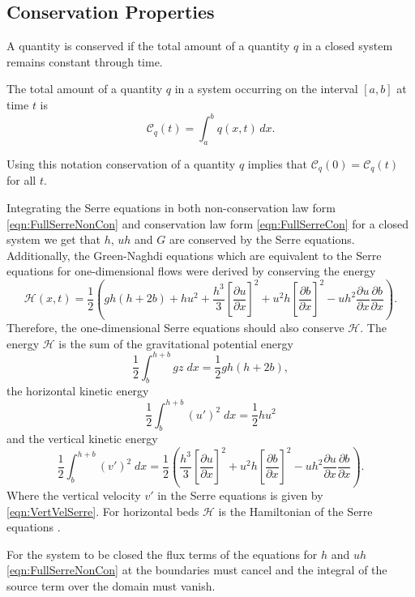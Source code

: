 \subsection{Conservation Properties}
A quantity is conserved if the total amount of a quantity $q$ in a closed system remains constant through time.
\begin{defn}
	\label{defn:TotalAmmountab}
	The total amount of a quantity $q$ in a system occurring on the interval $[a,b]$ at time $t$ is
	\begin{equation*}
	\mathcal{C}_q(t) = \int_{a}^{b} q(x,t)\, dx.
	\end{equation*}
\end{defn}
Using this notation conservation of a quantity $q$ implies that $\mathcal{C}_{q}(0) = \mathcal{C}_{q}(t)$ for all $t$. 

Integrating the Serre equations in both non-conservation law form \eqref{eqn:FullSerreNonCon} and conservation law form \eqref{eqn:FullSerreCon} for a closed system we get that $h$, $uh$ and $G$ are conserved by the Serre equations. Additionally, the Green-Naghdi equations \cite{Green-Naghdi-1976-237} which are equivalent to the Serre equations for one-dimensional flows were derived by conserving the energy
\begin{equation*}
	\mathcal{H}(x,t) = \frac{1}{2} \left( gh\left(h + 2b\right) + hu^2  + \frac{h^3}{3} \left[\frac{\partial u}{\partial x}\right]^2 + u^2h\left[\frac{\partial b}{\partial x}\right]^2 - uh^2 \frac{\partial u}{\partial x} \frac{\partial b}{\partial x}  \right).
	\label{eqn:Hamildef}
\end{equation*}
Therefore, the one-dimensional Serre equations should also conserve $\mathcal{H}$. The energy $\mathcal{H}$ is the sum of the gravitational potential energy
\[\frac{1}{2}\int_{b}^{h +b} gz \; dx = \frac{1}{2}gh\left(h + 2b\right),\]
the horizontal kinetic energy
\[\frac{1}{2}\int_{b}^{h +b} (u')^2 \; dx = \frac{1}{2}hu^2\]
and the vertical kinetic energy
\[\frac{1}{2}\int_{b}^{h +b} (v')^2 \; dx = \frac{1}{2} \left(\frac{h^3}{3} \left[\frac{\partial u}{\partial x}\right]^2 + u^2h\left[\frac{\partial b}{\partial x}\right]^2 - uh^2 \frac{\partial u}{\partial x} \frac{\partial b}{\partial x} \right).\]
Where the vertical velocity $v'$ in the Serre equations is given by \eqref{eqn:VertVelSerre}. For horizontal beds $\mathcal{H}$ is the Hamiltonian of the Serre equations \cite{Li-Y-2002}.
 
For the system to be closed the flux terms of the equations for $h$ and $uh$ \eqref{eqn:FullSerreNonCon} at the boundaries must cancel and the integral of the source term over the domain must vanish.

